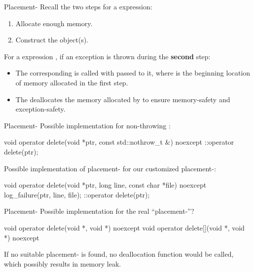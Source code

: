 \documentclass{beamer}
\begin{document}
\begin{frame}[fragile]{Placement-}
  Recall the two steps for a  expression:
  \begin{enumerate}
    \item Allocate enough memory.
    \item Construct the object(s).
  \end{enumerate}
  For a  expression , if an exception is thrown during the \textbf{second} step:
  \begin{itemize}
    \item The corresponding  is called with  passed to it, where  is the beginning location of memory allocated in the first step.
    \item The  deallocates the memory allocated by  to ensure memory-safety and exception-safety.
  \end{itemize}
\end{frame}

\begin{frame}[fragile]{Placement-}
  Possible implementation for non-throwing :
  \begin{cpp}
void operator delete(void *ptr,
                     const std::nothrow_t &) noexcept {
  ::operator delete(ptr);
}
  \end{cpp}
  \pause
  Possible implementation of placement- for our customized placement-:
  \begin{cpp}
void operator delete(void *ptr,
            long line, const char *file) noexcept {
  log_failure(ptr, line, file);
  ::operator delete(ptr);
}
  \end{cpp}
\end{frame}

\begin{frame}[fragile]{Placement-}
  Possible implementation for the real ``placement-''?
  \pause
  \begin{cpp}
void operator delete(void *, void *) noexcept {}
void operator delete[](void *, void *) noexcept {}
  \end{cpp}
  \pause
  \begin{notice}
    If no suitable placement- is found, no deallocation function would be called, which possibly results in memory leak.
  \end{notice}
\end{frame}
\end{document}
